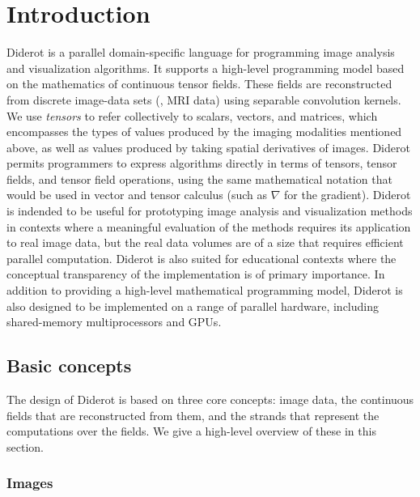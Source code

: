 %

\chapter{Introduction}

Diderot is a parallel domain-specific language for programming image analysis and
visualization algorithms.
It supports a high-level programming model based on the mathematics of continuous
tensor fields.
These fields are reconstructed from discrete image-data sets (\eg{}, MRI data) using
separable convolution kernels.
We use \emph{tensors} to refer collectively to scalars,
vectors, and matrices, which encompasses the types of values produced
by the imaging modalities mentioned above, as well as values produced
by taking spatial derivatives of images.
Diderot permits programmers to express algorithms directly in terms of
tensors, tensor fields, and tensor field operations, using the same
mathematical notation that would be used in vector and tensor calculus
(such as $\nabla$ for the gradient).
Diderot is indended to be useful for prototyping image
analysis and visualization methods in contexts where a meaningful
evaluation of the methods requires its application to real image data,
but the real data volumes are of a size that requires efficient
parallel computation.
Diderot is also suited for educational contexts where the conceptual
transparency of the implementation is of primary importance.
In addition to providing a high-level mathematical programming model,
Diderot is also designed to be implemented on a range of parallel hardware,
including shared-memory multiprocessors and GPUs.

\section{Basic concepts}
The design of Diderot is based on three core concepts: image data, the continuous fields
that are reconstructed from them, and the strands that represent the computations over
the fields.
We give a high-level overview of these in this section.

\subsection{Images}

